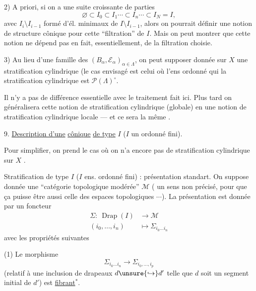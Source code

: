 2) A priori, si on a une suite  croissante
de parties
\[
 \varnothing\subset I_0\subset I_1\cdots\subset I_n\cdots\subset I_N=I,
\]
avec 
 \(I_i\setminus I_{i-1}\) formé d'él. minimaux
de \(I\setminus I_{i-1}\), alors on pourrait définir
 une notion de structure cônique
pour cette ``filtration'' de \(I\). Mais on
peut montrer que cette notion ne dépend pas
en fait, essentiellement, de la filtration
choisie.

3) Au lieu d'une famille des \((B_\alpha,\mathcal E_\alpha)_{\alpha\in\Lambda}\),
on peut supposer donnée sur \(X\) une
stratification cylindrique  (le cas envisagé
est celui où l'ens ordonné qui 
 la stratification cylindrique est
\(\mathcal P(\Lambda)^\circ\).


Il n'y a pas de différence essentielle avec
le traitement fait ici. Plus tard on
généralisera cette notion de stratification
cylindrique (globale) en une notion de
stratification cylindrique locale --- et ce sera
la même .

9. \uline{Description d'une} 
 \uline{cônique} \uline{de type} \(I\)
(\(I\) un ordonné fini).

Pour simplifier, on prend  le cas où on
n'a encore pas de stratification cylindrique
sur \(X\) .




Stratification 
de type \(I\) (\(I\) ens. ordonné fini) : présentation standart.
On suppose donnée une ``catégorie topologique modérée'' \(\mathcal M\)
( un sens non précisé, pour que ça puisse être aussi celle des
espaces topologiques \(\cdots\)). La présentation est donnée
par un  foncteur
\[
 \begin{aligned}
 \Sigma:\ \operatorname{Drap}(I)&\longrightarrow\mathcal M\\
 (i_0,\ldots,i_n)&\longmapsto\Sigma_{i_0\ldots i_n}
 \end{aligned}
\]
avec les propriétés suivantes

(1) Le  morphisme
\[
 \Sigma_{i_0\ldots i_n}\longrightarrow\Sigma_{i_0,\ldots,i_p}
\]
(relatif à une inclusion de drapeaux
\(d\unsure{\hookrightarrow}d'\) telle
que \(d\) soit un segment initial de \(d'\)) est \uline{fibrant}\(^*\).

